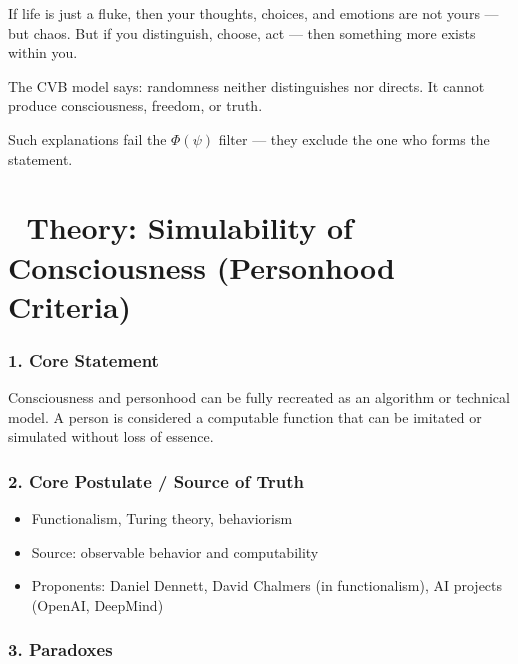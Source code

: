 \documentclass[12pt]{article}
\begin{document}
If life is just a fluke, then your thoughts, choices, and emotions are not yours — but chaos. But if you distinguish, choose, act — then something more exists within you.

The CVB model says: randomness neither distinguishes nor directs. It cannot produce consciousness, freedom, or truth.

Such explanations fail the $\Phi(\psi)$ filter — they exclude the one who forms the statement.

\section*{🔷 Theory: Simulability of Consciousness (Personhood Criteria)}

\subsubsection*{1. Core Statement}

Consciousness and personhood can be fully recreated as an algorithm or technical model. A person is considered a computable function that can be imitated or simulated without loss of essence.

\subsubsection*{2. Core Postulate / Source of Truth}

\begin{itemize}
\item Functionalism, Turing theory, behaviorism
\item Source: observable behavior and computability
\item Proponents: Daniel Dennett, David Chalmers (in functionalism), AI projects (OpenAI, DeepMind)
\end{itemize}

\subsubsection*{3. Paradoxes}
\end{document}
